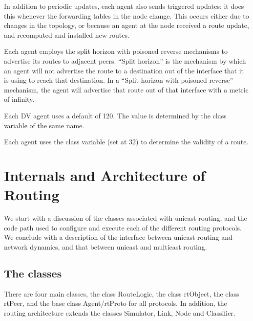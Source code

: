 In addition to periodic updates, each agent also sends triggered updates;
it does this whenever the forwarding tables in the node change.
This occurs either due to changes in the topology, 
or because an agent at the node received a route update,
and recomputed and installed new routes.

Each agent employs the split horizon with poisoned reverse mechanisms
to advertise its routes to adjacent peers.
``Split horizon'' is the mechanism by which an agent will not advertise
the route to a destination out of the interface that it is using to
reach that destination.
In a ``Split horizon with poisoned reverse'' mechanism,
the agent will advertise that route out of that interface with 
a metric of infinity.

Each DV agent uses a default  of 120.
The value is determined by the class variable of the same name.

Each agent uses the class variable  (set at 32)
to determine the validity of a route.

\section{Internals and Architecture of Routing}
\label{sec:rtg-internals}

We start with a discussion of the classes associated with
unicast routing, and the code path used to configure and execute
each of the different routing protocols.
We conclude with a description of
the interface between unicast routing and network dynamics, and
that between unicast and multicast routing.

\subsection{The classes}
There are four main classes,
the class RouteLogic, the class rtObject, the class rtPeer, and the
base class Agent/rtProto for all protocols.
In addition, the routing architecture extends 
the classes Simulator, Link, Node and Classifier.

